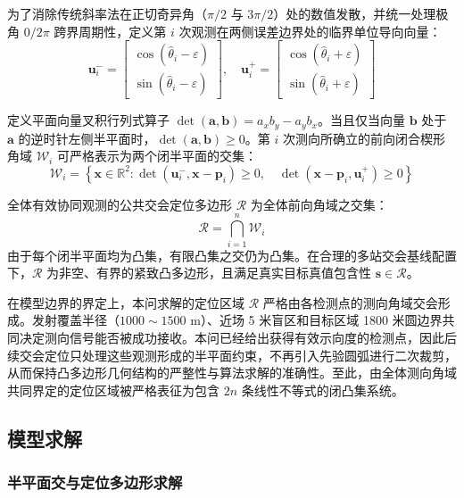 \documentclass[zihao=-4,a4paper,UTF8]{ctexart}
\begin{document}
为了消除传统斜率法在正切奇异角（$\pi/2$ 与 $3\pi/2$）处的数值发散，并统一处理极角 $0/2\pi$ 跨界周期性，定义第 $i$ 次观测在两侧误差边界处的临界单位导向向量：
\begin{equation}
    \mathbf{u}_i^- = \begin{bmatrix} \cos(\hat\theta_i - \varepsilon) \\ \sin(\hat\theta_i - \varepsilon) \end{bmatrix}, \quad
    \mathbf{u}_i^+ = \begin{bmatrix} \cos(\hat\theta_i + \varepsilon) \\ \sin(\hat\theta_i + \varepsilon) \end{bmatrix}
\end{equation}

定义平面向量叉积行列式算子 $\det(\mathbf{a},\mathbf{b}) = a_x b_y - a_y b_x$。当且仅当向量 $\mathbf{b}$ 处于 $\mathbf{a}$ 的逆时针左侧半平面时，$\det(\mathbf{a},\mathbf{b}) \ge 0$。第 $i$ 次测向所确立的前向闭合楔形角域 $\mathcal{W}_i$ 可严格表示为两个闭半平面的交集：
\begin{equation}
    \mathcal{W}_i = \left\{ \mathbf{x} \in \mathbb{R}^2 : \det(\mathbf{u}_i^-, \mathbf{x}-\mathbf{p}_i) \ge 0, \quad \det(\mathbf{x}-\mathbf{p}_i, \mathbf{u}_i^+) \ge 0 \right\}
\end{equation}

全体有效协同观测的公共交会定位多边形 $\mathcal{R}$ 为全体前向角域之交集：
\begin{equation}
    \mathcal{R} = \bigcap_{i=1}^{n} \mathcal{W}_i
\end{equation}
由于每个闭半平面均为凸集，有限凸集之交仍为凸集。在合理的多站交会基线配置下，$\mathcal{R}$ 为非空、有界的紧致凸多边形，且满足真实目标真值包含性 $\mathbf{s} \in \mathcal{R}$。

在模型边界的界定上，本问求解的定位区域 $\mathcal{R}$ 严格由各检测点的测向角域交会形成。发射覆盖半径（$1000\sim 1500\text{ m}$）、近场 5 米盲区和目标区域 1800 米圆边界共同决定测向信号能否被成功接收。本问已经给出获得有效示向度的检测点，因此后续交会定位只处理这些观测形成的半平面约束，不再引入先验圆弧进行二次裁剪，从而保持凸多边形几何结构的严整性与算法求解的准确性。至此，由全体测向角域共同界定的定位区域被严格表征为包含 $2n$ 条线性不等式的闭凸集系统。

\subsection{模型求解}

\subsubsection{半平面交与定位多边形求解}
\end{document}
